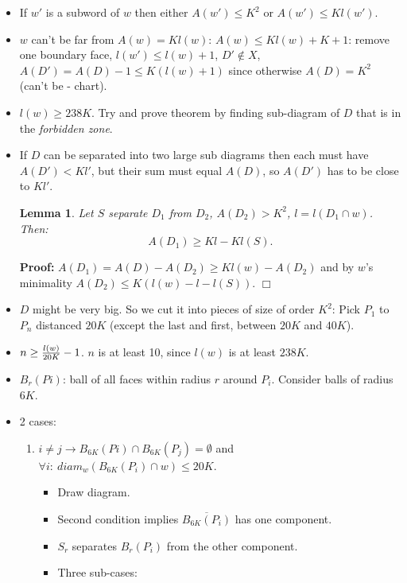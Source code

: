\documentclass[11pt]{article} \usepackage{amssymb}
\newtheorem{lemma}[theorem]{Lemma}
\newenvironment{proof}{\noindent \textbf{Proof:}}{$\Box$}
\begin{document}
\begin{enumerate}
\begin{itemize}
    \item If $w'$ is a subword of $w$ then either $A(w')\leq K^2$ or
      $A(w')\leq Kl(w')$.
    \item $w$ can't be far from $A(w)=Kl(w)$: 
      $A(w)\leq Kl(w)+K+1$: remove one boundary face, $l(w')\leq l(w)+1$, $D'\not \in X$,
      $A(D') = A(D)-1\leq K(l(w)+1)$ since otherwise $A(D)=K^2$ (can't be - chart).
    \item $l(w)\geq 238K$. Try and prove theorem by finding sub-diagram of $D$ that
      is in the {\em forbidden zone}.
    \item If $D$ can be separated into two large sub diagrams then each
      must have $A(D')<Kl'$, but their sum must equal $A(D)$, so $A(D')$ has
      to be close to $Kl'$.
      \begin{lemma}
        Let $S$ separate $D_1$ from $D_2$, $A(D_2)>K^2$, $l=l(D_1\cap w)$. 
        Then:
        \begin{equation}
          A(D_1)\geq Kl-Kl(S).  
        \end{equation}
      \end{lemma}
      \begin{proof}
        $A(D_1)=A(D)-A(D_2)\geq Kl(w)-A(D_2)$ and
        by $w$'s minimality $A(D_2)\leq K(l(w)-l-l(S))$.
      \end{proof}
    \item $D$ might be very big. So we cut it into pieces of size of order 
      $K^2$:
      Pick $P_1$ to $P_n$ distanced $20K$ 
      (except the last and first, between $20K$
      and $40K$).
    \item $n\geq {l(w)\over 20K}-1$. $n$ is at least 10, since $l(w)$ is at least $238K$.
    \item $B_r(Pi)$: ball of all faces within radius $r$ around $P_i$. Consider
      balls of radius $6K$.
    \item 2 cases:
      \begin{enumerate}
      \item $i\neq j\to B_{6K}(Pi)\cap B_{6K}(P_j)=\emptyset$ and 
        $\forall i:\:diam_w(B_{6K}(P_i)\cap w)\leq 20K$.
        \begin{itemize}
        \item Draw diagram.
        \item Second condition implies $\overline{B_{6K}(P_i)}$ has one 
          component.
        \item $S_r$ separates $B_r(P_i)$ from the other component.
        \item Three sub-cases:

\end{itemize}
\end{enumerate}
\end{itemize}
\end{enumerate}
\end{document}
